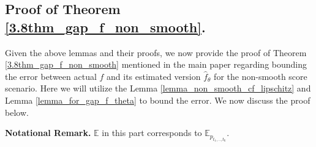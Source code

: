 \documentclass[11pt]{article}
\def\rvx{{\mathbf{x}}}
\def\rvy{{\mathbf{y}}}
\newcommand{\E}{\mathbb{E}}
\newtheorem{theorem}[lemma]{Theorem}
\begin{document}

\vspace{0.2in}

\subsection{Proof of Theorem \ref{3.8thm_gap_f_non_smooth}.} 
\label{proof_thm_3.7}
Given the above lemmas and their proofs, we now provide the proof of Theorem \ref{3.8thm_gap_f_non_smooth} mentioned in the main paper regarding bounding the error between actual ${f}$ and its estimated version $\hat{f}_\theta$ for the non-smooth score scenario. Here we will utilize the Lemma \ref{lemma_non_smooth_cf_lipschitz} and Lemma \ref{lemma_for_gap_f_theta} to bound the error.  We now discuss the proof below.

\noindent
\textbf{Notational Remark.} $\mathbb{E}$ in this part corresponds to $\mathbb{E}_{p_{t_1,..,t_k}}$. 
\end{document}
